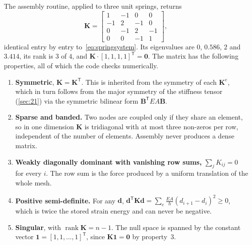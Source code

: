 \documentclass[11pt,a4paper]{article}
\numberwithin{equation}{section}
\theoremstyle{remark}
\newcommand{\bB}{\bm{B}}
\newcommand{\bK}{\bm{K}}
\newcommand{\bd}{\bm{d}}
\begin{document}
The assembly routine, applied to three unit springs, returns
\begin{equation*}
  \bK = \begin{bmatrix} 1 & -1 & 0 & 0 \\ -1 & 2 & -1 & 0 \\ 0 & -1 & 2 & -1 \\ 0 & 0 & -1 & 1 \end{bmatrix},
\end{equation*}
identical entry by entry to~\eqref{eq:springsystem}. Its eigenvalues are $0$, $0.586$, $2$ and
$3.414$, its rank is $3$ of $4$, and $\bK\cdot[1,1,1,1]^{\mathsf{T}} = \bm{0}$. The matrix has the
following properties, all of which the code checks numerically.
\begin{enumerate}\setlength{\itemsep}{2pt}
  \item \textbf{Symmetric}, $\bK = \bK^{\mathsf{T}}$. This is inherited from the symmetry
    of each $\bK^e$, which in turn follows from the major symmetry of the stiffness tensor
    (\cref{sec:21}) via the symmetric bilinear form $\bB^{\mathsf{T}}EA\bB$.
  \item \textbf{Sparse and banded.} Two nodes are coupled only if they share an element,
    so in one dimension $\bK$ is tridiagonal with at most three non-zeros per row,
    independent of the number of elements. Assembly never produces a dense matrix.
  \item \textbf{Weakly diagonally dominant with vanishing row sums,}
    $\sum_j K_{ij} = 0$ for every $i$. The row sum is the force produced by a uniform
    translation of the whole mesh.
  \item \textbf{Positive semi-definite.} For any $\bd$,
    $\bd^{\mathsf{T}}\bK\bd = \sum_e \tfrac{EA}{h}(d_{i+1}-d_i)^2 \ge 0$, which is twice
    the stored strain energy and can never be negative.
  \item \textbf{Singular}, with $\operatorname{rank}\bK = n-1$. The null space is spanned
    by the constant vector $\bm{1} = [1,1,\dots,1]^{\mathsf{T}}$, since
    $\bK\bm{1} = \bm{0}$ by property~3.
\end{enumerate}
\end{document}
